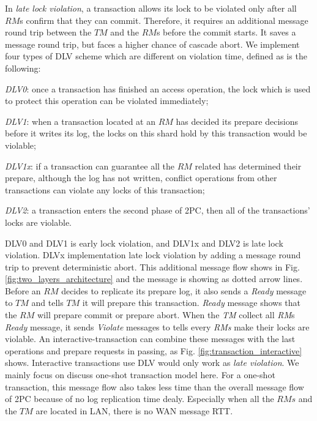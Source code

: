 \documentclass[conference]{IEEEtran}
\begin{document}
In \emph{late lock violation}, a transaction allows its lock to be violated only after all $RM$s confirm that they can commit.
Therefore, it requires an additional message round trip between the $TM$ and the $RM$s before the commit starts.
It saves a message round trip, but faces a higher chance of cascade abort.
We implement four types of DLV scheme which are different on violation time, defined as is the following:

\emph{DLV0}: once a transaction has finished an access operation, the lock which is used to protect this operation can be violated immediately;

\emph{DLV1}: when a transaction located at an ${RM}$ has decided its prepare decisions before it writes its log, the locks on this shard hold by this transaction would be violable;

\emph{DLV1x}: if a transaction can guarantee all the ${RM}$ related has determined their prepare, although the log has not written, conflict operations from other transactions can violate any locks of this transaction;

\emph{DLV2}: a transaction enters the second phase of 2PC, then all of the transactions' locks are violable.

DLV0 and DLV1 is early lock violation, and DLV1x and DLV2 is late lock violation.
DLVx implementation late lock violation by adding a message round trip to prevent deterministic abort.
This additional message flow shows in Fig.   \ref{fig:two_layers_architecture} and the message is showing as dotted arrow lines.
Before an ${RM}$ decides to replicate its prepare log, it also sends a \emph{Ready} message to ${TM}$ and tells ${TM}$ it will prepare this transaction.
\emph{Ready} message shows that the ${RM}$ will prepare commit or prepare abort.
When the \emph{TM} collect all \emph{RM}s \emph{Ready} message, it sends \emph{Violate} messages to tells every \emph{RMs} make their locks are violable.
An interactive-transaction can combine these messages with the last operations and prepare requests in passing, as Fig.   \ref{fig:transaction_interactive} shows.
Interactive transactions use DLV would only work as \emph{late violation}.
We mainly focus on discuss one-shot transaction model here.
For a one-shot transaction, this message flow also takes less time than the overall message flow of 2PC because of no log replication time dealy.
Especially when all the ${RMs}$ and the ${TM}$ are located in LAN, there is no WAN message RTT.
\end{document}
